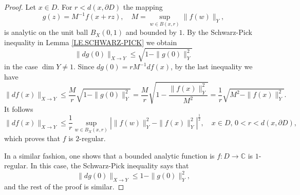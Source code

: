 \documentclass[10pt,a4paper]{amsart}
\begin{document}
\begin{proof}
Let $x\in D$. For $r<d(x, \partial D)$ the mapping
\begin{equation*}
g( z ) = M ^{-1}f(x + rz),\quad M = \sup_{w\in B(x, r)}\|f(w)\|_Y,
\end{equation*}
is analytic on the unit ball $B_X(0,1)$ and bounded by $1$. By the Schwarz-Pick inequality in Lemma \ref{LE.SCHWARZ-PICK}
we obtain
\begin{equation*}
\|dg (0)\|_{X\to Y}\le \sqrt{1 -\|g(0)\|^2_Y }
\end{equation*}
in the case $\dim Y\not  = 1$. Since  $d g(0) =  r M ^{-1}df(x)$, by the last inequality we have
\begin{equation*}
\|d f (x) \|_{X\to Y} \le \frac {M}r \sqrt{1-\|g(0)\|^2_Y}
=  \frac {M}r \sqrt{1- \frac {\|f(x)\|^2_Y}{M^2}}
= \frac 1r \sqrt{ M^2 -  \|f(x)\|^2_Y} .
\end{equation*}
It follows
\begin{equation*}
\|d f (x) \|_{X\to Y} \le \frac 1 r \sup_{w\in B_X(x,r)} | \|f(w) \|^2_Y  - \| f(x)\|_Y^2|^{\frac 12},
\quad x\in D,\, 0<r<d(x,\partial D),
\end{equation*}
which proves  that  $f$  is $2$-regular.

In a similar fashion, one shows that a bounded analytic function is $f:D \to \mathbb {C}$ is $1$-regular. In this case,
the Schwarz-Pick inequality says that
\begin{equation*}
\|d g (0)\|_{X\to Y}\le  1 -\|g(0)\|^2_Y,
\end{equation*}
and the rest of the proof is similar.
\end{proof}
\end{document}
